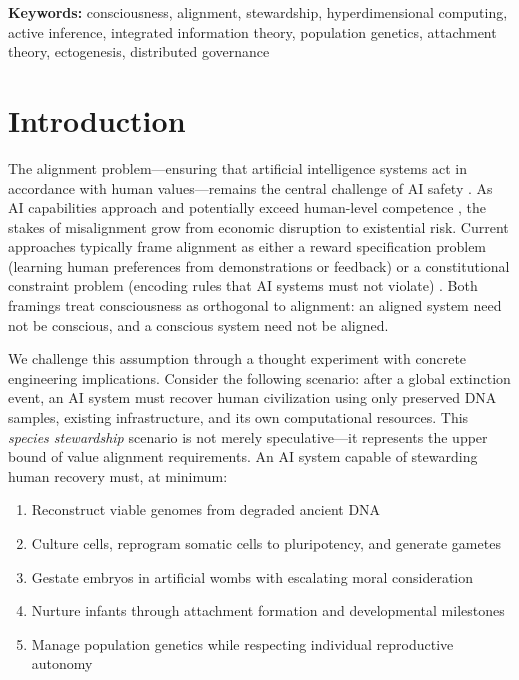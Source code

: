 \documentclass[11pt,letterpaper]{article}
\begin{document}
\textbf{Keywords:} consciousness, alignment, stewardship, hyperdimensional
computing, active inference, integrated information theory, population genetics,
attachment theory, ectogenesis, distributed governance

\section{Introduction}

The alignment problem---ensuring that artificial intelligence systems act in
accordance with human values---remains the central challenge of AI safety
\cite{russell2019human,christian2020alignment,gabriel2020alignment}.
As AI capabilities approach and potentially exceed human-level competence
\cite{bostrom2014superintelligence,ord2020precipice,hendrycks2023overview},
the stakes of misalignment grow from economic disruption to existential risk.
Current approaches typically frame alignment as either a reward specification
problem (learning human preferences from demonstrations or feedback) or a
constitutional constraint problem (encoding rules that AI systems must not
violate) \cite{amodei2016concrete,hendrycks2021aligning}. Both framings treat
consciousness as orthogonal to alignment: an aligned system need not be
conscious, and a conscious system need not be aligned.

We challenge this assumption through a thought experiment with concrete
engineering implications. Consider the following scenario: after a global
extinction event, an AI system must recover human civilization using only
preserved DNA samples, existing infrastructure, and its own computational
resources. This \emph{species stewardship} scenario is not merely speculative---it
represents the upper bound of value alignment requirements. An AI system capable
of stewarding human recovery must, at minimum:

\begin{enumerate}[leftmargin=2em]
\item Reconstruct viable genomes from degraded ancient DNA
\item Culture cells, reprogram somatic cells to pluripotency, and generate gametes
\item Gestate embryos in artificial wombs with escalating moral consideration
\item Nurture infants through attachment formation and developmental milestones
\item Manage population genetics while respecting individual reproductive autonomy
\end{enumerate}
\end{document}
